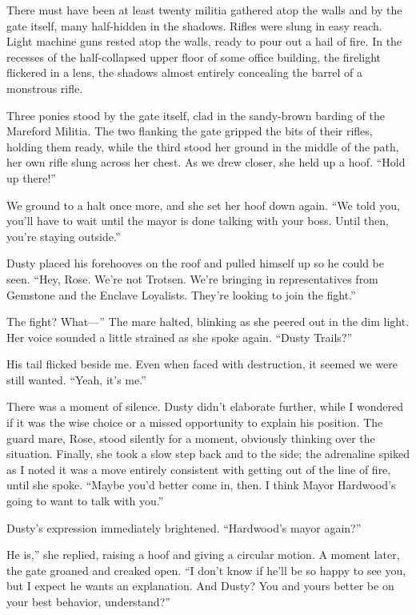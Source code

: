 There must have been at least twenty militia gathered atop the walls and by the gate itself, many half-hidden in the shadows. Rifles were slung in easy reach. Light machine guns rested atop the walls, ready to pour out a hail of fire. In the recesses of the half-collapsed upper floor of some office building, the firelight flickered in a lens, the shadows almost entirely concealing the barrel of a monstrous rifle.

Three ponies stood by the gate itself, clad in the sandy-brown barding of the Mareford Militia. The two flanking the gate gripped the bits of their rifles, holding them ready, while the third stood her ground in the middle of the path, her own rifle slung across her chest. As we drew closer, she held up a hoof. “Hold up there!”

We ground to a halt once more, and she set her hoof down again. “We told you, you’ll have to wait until the mayor is done talking with your boss. Until then, you’re staying outside.”

Dusty placed his forehooves on the roof and pulled himself up so he could be seen. “Hey, Rose. We’re not Trotsen. We’re bringing in representatives from Gemstone and the Enclave Loyalists. They’re looking to join the fight.”

\leavevmode{}The fight? What—” The mare halted, blinking as she peered out in the dim light. Her voice sounded a little strained as she spoke again. “Dusty Trails?”

His tail flicked beside me. Even when faced with destruction, it seemed we were still wanted. “Yeah, it’s me.”

There was a moment of silence. Dusty didn’t elaborate further, while I wondered if it was the wise choice or a missed opportunity to explain his position. The guard mare, Rose, stood silently for a moment, obviously thinking over the situation. Finally, she took a slow step back and to the side; the adrenaline spiked as I noted it was a move entirely consistent with getting out of the line of fire, until she spoke. “Maybe you’d better come in, then. I think Mayor Hardwood’s going to want to talk with you.”

Dusty’s expression immediately brightened. “Hardwood’s mayor again?”

\leavevmode{}He is,” she replied, raising a hoof and giving a circular motion. A moment later, the gate groaned and creaked open. “I don’t know if he’ll be so happy to see you, but I expect he wants an explanation. And Dusty? You and yours better be on your best behavior, understand?”


